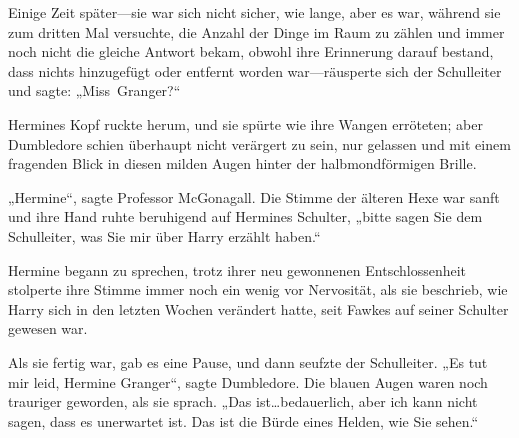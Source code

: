Einige Zeit später—sie war sich nicht sicher, wie lange, aber es war, während sie zum dritten Mal versuchte, die Anzahl der Dinge im Raum zu zählen und immer noch nicht die gleiche Antwort bekam, obwohl ihre Erinnerung darauf bestand, dass nichts hinzugefügt oder entfernt worden war—räusperte sich der Schulleiter und sagte: „Miss~Granger?“

Hermines Kopf ruckte herum, und sie spürte wie ihre Wangen erröteten; aber Dumbledore schien überhaupt nicht verärgert zu sein, nur gelassen und mit einem fragenden Blick in diesen milden Augen hinter der halbmondförmigen Brille.

„Hermine“, sagte Professor McGonagall. Die Stimme der älteren Hexe war sanft und ihre Hand ruhte beruhigend auf Hermines Schulter, „bitte sagen Sie dem Schulleiter, was Sie mir über Harry erzählt haben.“

Hermine begann zu sprechen, trotz ihrer neu gewonnenen Entschlossenheit stolperte ihre Stimme immer noch ein wenig vor Nervosität, als sie beschrieb, wie Harry sich in den letzten Wochen verändert hatte, seit Fawkes auf seiner Schulter gewesen war.

Als sie fertig war, gab es eine Pause, und dann seufzte der Schulleiter. „Es tut mir leid, Hermine Granger“, sagte Dumbledore. Die blauen Augen waren noch trauriger geworden, als sie sprach. „Das ist…bedauerlich, aber ich kann nicht sagen, dass es unerwartet ist. Das ist die Bürde eines Helden, wie Sie sehen.“

